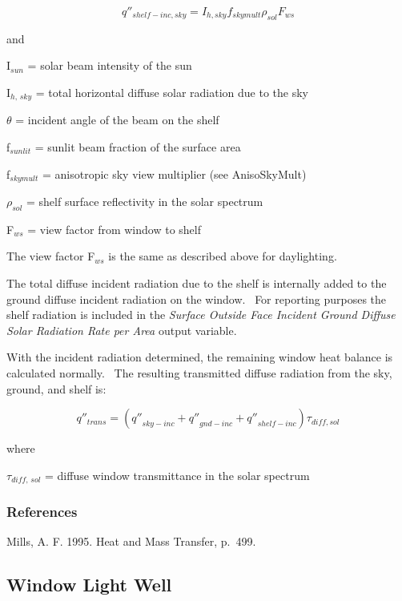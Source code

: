 \begin{equation}
{q''_{shelf - inc,sky}} = {I_{h,sky}}{f_{skymult}}{\rho_{sol}}{F_{ws}}
\end{equation}

and

I\(_{sun}\) = solar beam intensity of the sun

I\(_{h,\, sky}\) = total horizontal diffuse solar radiation due to the sky

\(\theta\) = incident angle of the beam on the shelf

f\(_{sunlit}\) = sunlit beam fraction of the surface area

f\(_{skymult}\) = anisotropic sky view multiplier (see AnisoSkyMult)

\(\rho_{sol}\) = shelf surface reflectivity in the solar spectrum

F\(_{ws}\) = view factor from window to shelf

The view factor F\(_{ws}\) is the same as described above for daylighting.

The total diffuse incident radiation due to the shelf is internally added to the ground diffuse incident radiation on the window.~ For reporting purposes the shelf radiation is included in the \emph{Surface Outside Face Incident Ground Diffuse Solar Radiation Rate per Area} output variable.

With the incident radiation determined, the remaining window heat balance is calculated normally.~ The resulting transmitted diffuse radiation from the sky, ground, and shelf is:

\begin{equation}
{q''_{trans}} = \left( {{{q''}_{sky - inc}} + {{q''}_{gnd - inc}} + {{q''}_{shelf - inc}}} \right){\tau_{diff,sol}}
\end{equation}

where

\(\tau_{diff,\, sol}\) = diffuse window transmittance in the solar spectrum

\subsubsection{References}\label{references-1-006}

Mills, A. F. 1995. Heat and Mass Transfer, p.~499.

\subsection{Window Light Well}\label{window-light-well}

